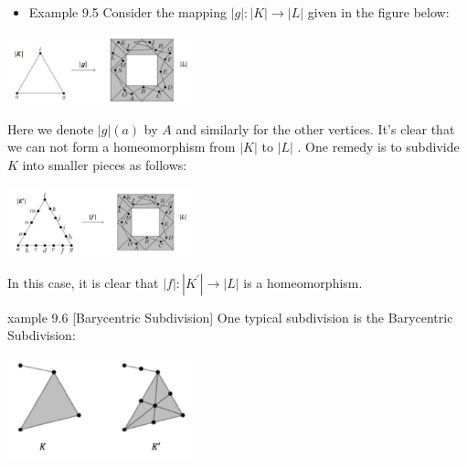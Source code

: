 \begin{itemize}
\item Example 9.5 Consider the mapping \(\left| g\right|  : \left| K\right|  \rightarrow  \left| L\right|\) given in the figure below:
\end{itemize}

\begin{center}
\includegraphics[max width=0.4\textwidth]{images/bo_d2bcsrref24c73avs720_95_555_1235_554_208_0.jpg}
\end{center}
\hspace*{3em} 

Here we denote \(\left| g\right| \left( a\right)\) by \(A\) and similarly for the other vertices. It’s clear that we can not form a homeomorphism from \(\left| K\right|\) to \(\left| L\right|\) . One remedy is to subdivide \(K\) into smaller pieces as follows:

\begin{center}
\includegraphics[max width=0.4\textwidth]{images/bo_d2bcsrref24c73avs720_95_565_1757_556_208_0.jpg}
\end{center}
\hspace*{3em} 

In this case, it is clear that \(\left| f\right|  : \left| {K}^{\prime }\right|  \rightarrow  \left| L\right|\) is a homeomorphism.

xample 9.6 [Barycentric Subdivision] One typical subdivision is the Barycentric Subdivision:

\begin{center}
\includegraphics[max width=0.4\textwidth]{images/bo_d2bcsrref24c73avs720_96_701_528_552_311_0.jpg}
\end{center}
\hspace*{3em} 

